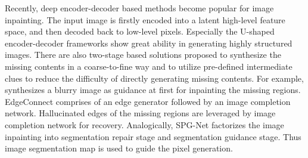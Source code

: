 \documentclass[journal]{IEEEtran}
\begin{document}
Recently, deep encoder-decoder based methods \cite{pathak2016context,iizuka2017globally,yeh2017semantic} become popular for image inpainting. 
The input image is firstly encoded into a latent high-level feature space, and then decoded back to low-level pixels. 
Especially the U-shaped encoder-decoder frameworks show great ability in generating highly structured images. {} There are also two-stage based solutions proposed to synthesize the missing contents in a coarse-to-fine way and to utilize pre-defined intermediate clues to reduce the difficulty of directly generating missing contents. 
For example, \cite{yu2018generative} synthesizes a blurry image as guidance at first for inpainting the missing regions. EdgeConnect \cite{nazeri2019edgeconnect} comprises of an edge generator followed by an image completion network. 
Hallucinated edges of the missing regions are leveraged by image completion network for recovery.
Analogically, SPG-Net \cite{song2018spgnet} factorizes the image inpainting into segmentation repair stage and segmentation guidance stage. Thus image segmentation map is used to guide the pixel generation. {}
\end{document}
